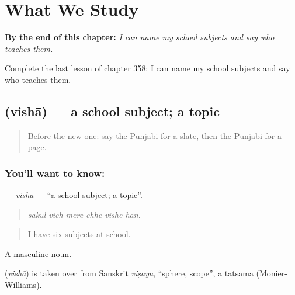 
\chapter{What We Study}
\label{ch:pa-a2-what-we-study}

\begin{chapteropening}
\textbf{By the end of this chapter:} \emph{I can name my school subjects and say who teaches them.}

Complete the last lesson of chapter 358: I can name my school subjects and say who teaches them.
\end{chapteropening}

\section[\texorpdfstring{\pa{ਵਿਸ਼ਾ} (vishā)}{ਵਿਸ਼ਾ (vishā)}]{ (vishā) — a school subject; a topic}

\label{lesson:PA-C358-visha}



\begin{quote}
Before the new one: say the Punjabi for a slate, then the Punjabi for a page.
\end{quote}

\subsection*{You'll want to know: }
\textbf{} — \emph{vishā} — \textquotedblleft{}a school subject; a topic\textquotedblright{}.

\begin{quote}
     
\end{quote}

\begin{quote}
\emph{sakūl vich mere chhe vishe han.}
\end{quote}

\begin{quote}
I have six subjects at school.
\end{quote}

A masculine noun.

\begin{cousinweb}
\textbf{} (\emph{vishā}) is taken over from Sanskrit \emph{viṣaya}, \textquotedblleft{}sphere, scope\textquotedblright{}, a tatsama (Monier-Williams).
\end{cousinweb}

